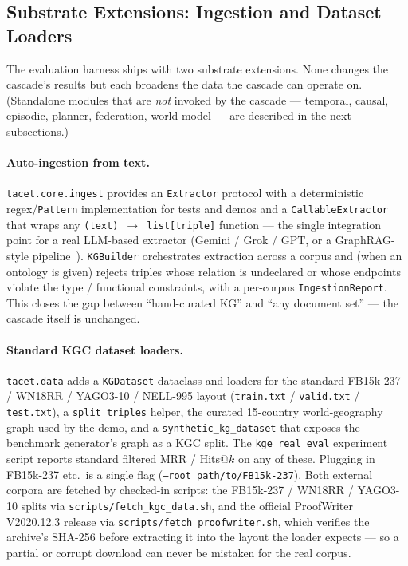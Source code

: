 \documentclass[11pt]{article}
\theoremstyle{plain}
\begin{document}
\subsection{Substrate Extensions: Ingestion and Dataset Loaders}
\label{sec:tier_a}

The evaluation harness ships with two substrate extensions. None changes the cascade's results but each broadens the data the
cascade can operate on. (Standalone modules that are \emph{not} invoked by the
cascade --- temporal, causal, episodic, planner, federation, world-model ---
are described in the next subsections.)

\paragraph{Auto-ingestion from text.}
\texttt{tacet.core.ingest} provides an \texttt{Extractor} protocol with a
deterministic regex/\texttt{Pattern} implementation for tests and demos
and a \texttt{CallableExtractor} that wraps any
\texttt{(text) $\to$ list[triple]} function --- the single integration
point for a real LLM-based extractor (Gemini / Grok / GPT, or a
GraphRAG-style pipeline~\citep{edge2024graphrag}). \texttt{KGBuilder}
orchestrates extraction across a corpus and (when an ontology is given)
rejects triples whose relation is undeclared or whose endpoints violate
the type / functional constraints, with a per-corpus
\texttt{IngestionReport}. This closes the gap between ``hand-curated KG''
and ``any document set'' --- the cascade itself is unchanged.

\paragraph{Standard KGC dataset loaders.}
\texttt{tacet.data} adds a \texttt{KGDataset} dataclass and loaders
for the standard FB15k-237 / WN18RR / YAGO3-10 / NELL-995 layout
(\texttt{train.txt} / \texttt{valid.txt} / \texttt{test.txt}), a
\texttt{split\_triples} helper, the curated 15-country world-geography
graph used by the demo, and a \texttt{synthetic\_kg\_dataset} that exposes
the benchmark generator's graph as a KGC split. The
\texttt{kge\_real\_eval} experiment script reports standard filtered
MRR / Hits@$k$ on any of these. Plugging in FB15k-237 etc.\ is a single
flag (\texttt{--root path/to/FB15k-237}).
Both external corpora are fetched by checked-in scripts: the FB15k-237 /
WN18RR / YAGO3-10 splits via \texttt{scripts/fetch\_kgc\_data.sh}, and the
official ProofWriter V2020.12.3 release via
\texttt{scripts/fetch\_proofwriter.sh}, which verifies the archive's SHA-256
before extracting it into the layout the loader expects --- so a partial or
corrupt download can never be mistaken for the real corpus.
\end{document}
